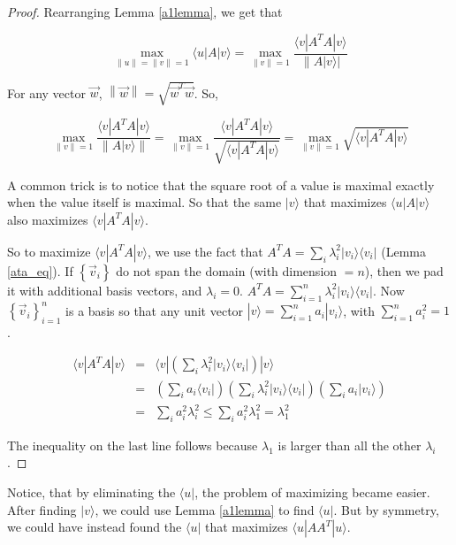 \documentclass{amsbook}
\begin{document}
\begin{proof}
Rearranging Lemma \ref{a1lemma}, we get that

$$
\max_{\|u\|=\|v\|=1}\langle u|A|v\rangle = \max_{\|v\|=1} \frac{\langle v|A^TA|v\rangle}{\left\|A|v\rangle\right|}
$$

For any vector $\vec w$, $\left\|\vec w\right\|=\sqrt{\vec w^T\vec w}$.  So,

$$
\max_{\|v\|=1} \frac{\langle v|A^TA|v\rangle}{\left\|A|v\rangle\right\|}
= \max_{\|v\|=1} \frac{\langle v|A^TA|v\rangle}{\sqrt{\langle v|A^TA|v\rangle}}
= \max_{\|v\|=1} \sqrt{\langle v|A^TA|v\rangle}
$$

A common trick is to notice that the square root of a value is maximal exactly when the value itself is maximal.  So that the same $|v\rangle$ that maximizes $\langle u|A|v\rangle$ also maximizes $\langle v|A^TA|v\rangle$.

So to maximize $\langle v|A^TA|v\rangle$, we use the fact that $A^TA=\sum_i\lambda_i^2|v_i\rangle\langle v_i|$ (Lemma \ref{ata_eq}).  If $\left\{\vec v_i\right\}$ do not span the domain (with dimension $=n$), then we pad it with additional basis vectors, and $\lambda_i=0$.  $A^TA=\sum_{i=1}^n\lambda_i^2|v_i\rangle\langle v_i|$.  Now $\left\{\vec v_i\right\}_{i=1}^n$ is a basis so that any unit vector $|v\rangle = \sum_{i=1}^na_i|v_i\rangle$, with $\sum_{i=1}^na_i^2 =1$.

\begin{equation}
\label{upperbound_eqn}
\begin{array}{rcl}
\langle v|A^TA|v\rangle &=& \langle v|\left(\sum_i\lambda_i^2|v_i\rangle\langle v_i|\right)|v\rangle \\
 &=& \left(\sum_i a_i\langle v_i|\right)\left(\sum_i\lambda_i^2|v_i\rangle\langle v_i|\right)\left(\sum_i a_i|v_i\rangle\right) \\
 &=& \sum_ia_i^2\lambda_i^2 
 \leq \sum_ia_i^2\lambda_1^2 
 = \lambda_1^2
\end{array}
\end{equation}

The inequality on the last line follows because $\lambda_1$ is larger than all the other $\lambda_i$.
\end{proof}

Notice, that by eliminating the $\langle u|$, the problem of maximizing became easier.  After finding $|v\rangle$, we could use Lemma \ref{a1lemma} to find $\langle u|$.  But by symmetry, we could have instead found the $\langle u|$ that maximizes $\langle u|AA^T|u\rangle$.
\end{document}
